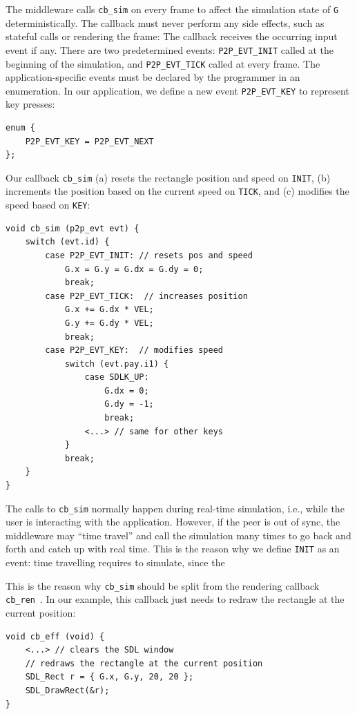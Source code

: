 \documentclass[10pt,journal,compsoc]{IEEEtran}
\newcommand{\code}[1]  {\texttt{\footnotesize{#1}}}
\begin{document}
The middleware calls \code{cb\_sim} on every frame to affect the simulation
state of \code{G} deterministically.
The callback must never perform any side effects, such as stateful calls or
rendering the frame:
The callback receives the occurring input event if any.
There are two predetermined events:
    \code{P2P\_EVT\_INIT} called at the beginning of the simulation, and
    \code{P2P\_EVT\_TICK} called at every frame.
The application-specific events must be declared by the programmer in an
enumeration.
In our application, we define a new event \code{P2P\_EVT\_KEY} to represent key
presses:

{\footnotesize
\begin{verbatim}
enum {
    P2P_EVT_KEY = P2P_EVT_NEXT
};
\end{verbatim}
}

Our callback \code{cb\_sim}
    (a) resets the rectangle position and speed on \code{INIT},
    (b) increments the position based on the current speed on \code{TICK}, and
    (c) modifies the speed based on \code{KEY}:

{\footnotesize
\begin{verbatim}
void cb_sim (p2p_evt evt) {
    switch (evt.id) {
        case P2P_EVT_INIT: // resets pos and speed
            G.x = G.y = G.dx = G.dy = 0;
            break;
        case P2P_EVT_TICK:  // increases position
            G.x += G.dx * VEL;
            G.y += G.dy * VEL;
            break;
        case P2P_EVT_KEY:  // modifies speed
            switch (evt.pay.i1) {
                case SDLK_UP:
                    G.dx = 0;
                    G.dy = -1;
                    break;
                <...> // same for other keys
            }
            break;
    }
}
\end{verbatim}
}


The calls to \code{cb\_sim} normally happen during real-time simulation, i.e.,
while the user is interacting with the application.
However, if the peer is out of sync, the middleware may ``time travel'' and
call the simulation many times to go back and forth and catch up with real
time.
This is the reason why we define \code{INIT} as an event: time travelling
requires to simulate, since the 

This is the reason why \code{cb\_sim} should be split from the rendering
callback \code{cb\_ren}~\cite{tml.js}.
In our example, this callback just needs to redraw the rectangle at the
current position:

{\footnotesize
\begin{verbatim}
void cb_eff (void) {
    <...> // clears the SDL window
    // redraws the rectangle at the current position
    SDL_Rect r = { G.x, G.y, 20, 20 };
    SDL_DrawRect(&r);
}
\end{verbatim}
}
\end{document}
